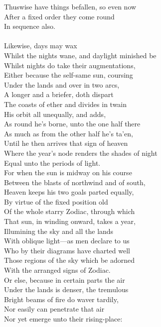 Thuswise have things befallen, so even now\\
After a fixed order they come round\\
In sequence also.\\
\\
Likewise, days may wax\\
Whilst the nights wane, and daylight minished be\\
Whilst nights do take their augmentations,\\
Either because the self-same sun, coursing\\
Under the lands and over in two arcs,\\
A longer and a briefer, doth dispart\\
The coasts of ether and divides in twain\\
His orbit all unequally, and adds,\\
As round he's borne, unto the one half there\\
As much as from the other half he's ta'en,\\
Until he then arrives that sign of heaven\\
Where the year's node renders the shades of night\\
Equal unto the periods of light.\\
For when the sun is midway on his course\\
Between the blasts of northwind and of south,\\
Heaven keeps his two goals parted equally,\\
By virtue of the fixed position old\\
Of the whole starry Zodiac, through which\\
That sun, in winding onward, takes a year,\\
Illumining the sky and all the lands\\
With oblique light—as men declare to us\\
Who by their diagrams have charted well\\
Those regions of the sky which be adorned\\
With the arranged signs of Zodiac.\\
Or else, because in certain parts the air\\
Under the lands is denser, the tremulous\\
Bright beams of fire do waver tardily,\\
Nor easily can penetrate that air\\
Nor yet emerge unto their rising-place:\\
